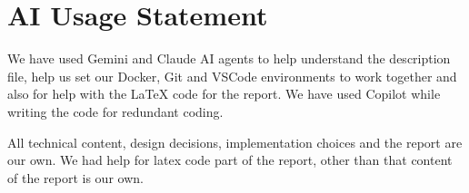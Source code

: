 \documentclass[12pt,a4paper]{article}
\begin{document}
\section*{AI Usage Statement}

We have used Gemini and Claude AI agents to help understand the description file, help us set our Docker, Git and VSCode environments to work together and also for help with the LaTeX code for the report. We have used Copilot while writing the code for redundant coding.

All technical content, design decisions, implementation choices and the report are our own. We had help for latex code part of the report, other than that content of the report is our own.
\end{document}
